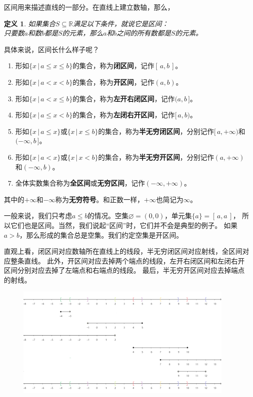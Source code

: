 \documentclass[12pt,UTF8]{ctexbook}
\newtheorem{df}{定义}[section]
\begin{document}
区间用来描述直线的一部分。在直线上建立数轴，那么，

\begin{df}\label{df:5-3-0}
    如果集合$S\subseteq \mathbb{R}$满足以下条件，就说它是区间：\\
    只要数$a$和数$b$都是$S$的元素，那么$a$和$b$之间的所有数都是$S$的元素。
\end{df}

具体来说，区间长什么样子呢？
\begin{enumerate}
    \item 形如$\{x \, | \, a \leqslant x \leqslant b\}$的集合，称为\textbf{闭区间}，记作$[\, a, b\,]$。
    \item 形如$\{x \, | \, a < x < b\}$的集合，称为\textbf{开区间}，记作$(a, b)$。
    \item 形如$\{x \, | \, a < x \leqslant b\}$的集合，称为\textbf{左开右闭区间}，记作$(a, b\,]$。
    \item 形如$\{x \, | \, a \leqslant x < b\}$的集合，称为\textbf{左闭右开区间}，记作$[\, a, b)$。
    \item 形如$\{x \, | \, a \leqslant x \}$或$\{x \, | \, x \leqslant b \}$的集合，称为\textbf{半无穷闭区间}，分别记作$[\, a, +\infty)$和$(-\infty, b\,]$。
    \item 形如$\{x \, | \, a < x \}$或$\{x \, | \, x < b \}$的集合，称为\textbf{半无穷开区间}，分别记作$(a, +\infty)$和$(-\infty, b)$。
    \item 全体实数集合称为\textbf{全区间}或\textbf{无穷区间}，记作$(-\infty, +\infty)$。
\end{enumerate}
其中的$+\infty$和$-\infty$称为\textbf{无穷符号}。和正数一样，$+\infty$也简记为$\infty$。

一般来说，我们只考虑$a \leqslant b$的情况。空集$\varnothing = (0, 0)$，单元集$\{a\} = [\, a, a\,]$，
所以它们也是区间。当然，我们说起“区间”时，它们并不会是典型的例子。
如果$a > b$，那么形成的集合总是空集。我们约定空集是开区间。

直观上看，闭区间对应数轴所在直线上的线段，半无穷闭区间对应射线，全区间对应整条直线。
此外，开区间对应去掉两个端点的线段，左开右闭区间和左闭右开区间分别对应去掉了左端点和右端点的线段。
最后，半无穷开区间对应去掉端点的射线。

\begin{figure}[H] %
    \vspace{8pt}
    \includegraphics[width=0.96\textwidth]{区间1.png}
\end{figure}
\end{document}
